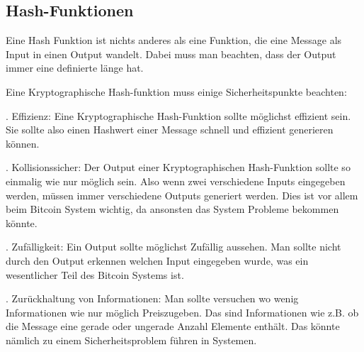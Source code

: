 \subsection*{Hash-Funktionen}
\noindent
Eine Hash Funktion ist nichts anderes als eine Funktion, die eine Message als Input in einen Output wandelt. Dabei muss man beachten, dass der Output immer eine definierte länge hat.

\noindent
Eine Kryptographische Hash-funktion muss einige Sicherheitspunkte beachten:

. Effizienz:
Eine Kryptographische Hash-Funktion sollte möglichst effizient sein. Sie sollte also einen Hashwert einer Message schnell und effizient generieren können.

. Kollisionssicher:
Der Output einer Kryptographischen Hash-Funktion sollte so einmalig wie nur möglich sein. Also wenn zwei verschiedene Inputs eingegeben werden, müssen immer verschiedene Outputs generiert werden.
Dies ist vor allem beim Bitcoin System wichtig, da ansonsten das System Probleme bekommen könnte.

. Zufälligkeit:
Ein Output sollte möglichst Zufällig aussehen. Man sollte nicht durch den Output erkennen welchen Input eingegeben wurde, was ein wesentlicher Teil des Bitcoin Systems ist.

. Zurückhaltung von Informationen:
Man sollte versuchen wo wenig Informationen wie nur möglich Preiszugeben. Das sind Informationen wie z.B. ob die Message eine gerade oder ungerade Anzahl Elemente enthält.
Das könnte nämlich zu einem Sicherheitsproblem führen in Systemen.
